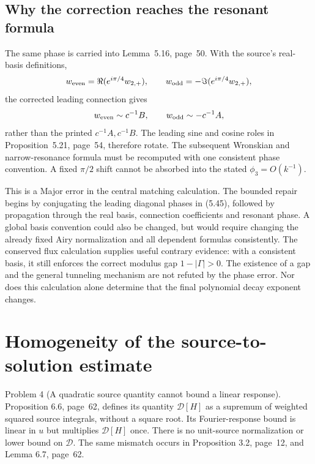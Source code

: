 \documentclass[10pt]{article}
\begin{document}
\subsection*{Why the correction reaches the resonant formula}
The same phase is carried into Lemma 5.16, page 50. With the source’s real-basis definitions, \[w_{\rm even}=\Re(e^{i\pi/4}w_{2,+}),\qquad
 w_{\rm odd}=-\Im(e^{i\pi/4}w_{2,+}),\] the corrected leading connection gives \[w_{\rm even}\sim c^{-1}B,\qquad
 w_{\rm odd}\sim-c^{-1}A,\] rather than the printed \(c^{-1}A,c^{-1}B\). The leading sine and cosine roles in Proposition 5.21, page 54, therefore rotate. The subsequent Wronskian and narrow-resonance formula must be recomputed with one consistent phase convention. A fixed \(\pi/2\) shift cannot be absorbed into the stated \(\phi_3=O(k^{-1})\).\par
This is a Major error in the central matching calculation. The bounded repair begins by conjugating the leading diagonal phases in (5.45), followed by propagation through the real basis, connection coefficients and resonant phase. A global basis convention could also be changed, but would require changing the already fixed Airy normalization and all dependent formulas consistently. The conserved flux calculation supplies useful contrary evidence: with a consistent basis, it still enforces the correct modulus gap \(1-|\Gamma|>0\). The existence of a gap and the general tunneling mechanism are not refuted by the phase error. Nor does this calculation alone determine that the final polynomial decay exponent changes.\par
\section*{Homogeneity of the source-to-solution estimate}
Problem 4 (A quadratic source quantity cannot bound a linear response).  Proposition 6.6, page 62, defines its quantity \(\mathcal D[H]\) as a supremum of weighted squared source integrals, without a square root. Its Fourier-response bound is linear in \(u\) but multiplies \(\mathcal D[H]\) once. There is no unit-source normalization or lower bound on \(\mathcal D\). The same mismatch occurs in Proposition 3.2, page 12, and Lemma 6.7, page 62.\par
\end{document}
